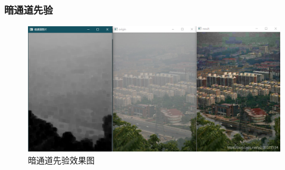    \begin{frame}
      \frametitle{暗通道先验}
      \begin{figure}
        \centering
        \includegraphics[width=\textwidth]{figures/pic9.png}
        \caption{暗通道先验效果图}
      \end{figure}
    \end{frame}